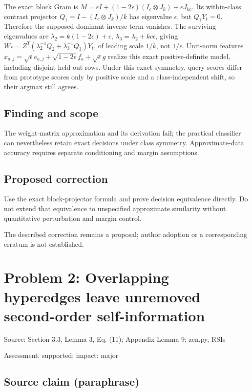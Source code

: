 \documentclass[11pt]{article}
\begin{document}
The exact block Gram is \(M=\epsilon I+(1-2\epsilon)(I_c\otimes J_k)+\epsilon J_{kc}\). Its within-class contrast projector \(Q_1=I-(I_c\otimes J_k)/k\) has eigenvalue \(\epsilon\), but \(Q_1Y_t=0\). Therefore the supposed dominant inverse term vanishes. The surviving eigenvalues are \(\lambda_2=k(1-2\epsilon)+\epsilon\), \(\lambda_3=\lambda_2+kc\epsilon\), giving \(W_*=Z^T(\lambda_2^{-1}Q_2+\lambda_3^{-1}Q_3)Y_t\), of leading scale \(1/k\), not \(1/\epsilon\). Unit-norm features \(x_{a,j}=\sqrt\epsilon e_{a,j}+\sqrt{1-2\epsilon}f_a+\sqrt\epsilon g\) realize this exact positive-definite model, including disjoint held-out rows. Under this exact symmetry, query scores differ from prototype scores only by positive scale and a class-independent shift, so their argmax still agrees.

\subsection*{Finding and scope}

The weight-matrix approximation and its derivation fail; the practical classifier can nevertheless retain exact decisions under class symmetry. Approximate-data accuracy requires separate conditioning and margin assumptions.

\subsection*{Proposed correction}

Use the exact block-projector formula and prove decision equivalence directly. Do not extend that equivalence to unspecified approximate similarity without quantitative perturbation and margin control.

The described correction remains a proposal; author adoption or a corresponding erratum is not established.

\section*{Problem 2: Overlapping hyperedges leave unremoved second-order self-information}

Source: Section 3.3, Lemma 3, Eq. (11); Appendix Lemma 9; zen.py, RSIs

Assessment: supported; impact: major

\subsection*{Source claim (paraphrase)}
\end{document}
